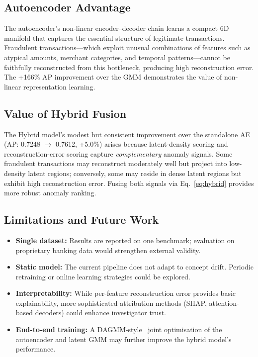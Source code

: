 \documentclass[conference,10pt]{IEEEtran}
\begin{document}
\subsection{Autoencoder Advantage}
The autoencoder's non-linear encoder--decoder chain learns a compact 6D
manifold that captures the essential structure of legitimate transactions.
Fraudulent transactions---which exploit unusual combinations of features such
as atypical amounts, merchant categories, and temporal patterns---cannot be
faithfully reconstructed from this bottleneck, producing high reconstruction
error.  The +166\% AP improvement over the GMM demonstrates the value of
non-linear representation learning.

\subsection{Value of Hybrid Fusion}
The Hybrid model's modest but consistent improvement over the standalone AE
(AP: 0.7248 $\rightarrow$ 0.7612, +5.0\%) arises because latent-density
scoring and reconstruction-error scoring capture \emph{complementary} anomaly
signals.  Some fraudulent transactions may reconstruct moderately well but
project into low-density latent regions; conversely, some may reside in dense
latent regions but exhibit high reconstruction error.  Fusing both signals via
Eq.~\eqref{eq:hybrid} provides more robust anomaly ranking.

\subsection{Limitations and Future Work}
\begin{itemize}[leftmargin=*]
\item \textbf{Single dataset:}  Results are reported on one benchmark;
      evaluation on proprietary banking data would strengthen external validity.
\item \textbf{Static model:}  The current pipeline does not adapt to concept
      drift.  Periodic retraining or online learning strategies could be
      explored.
\item \textbf{Interpretability:}  While per-feature reconstruction error
      provides basic explainability, more sophisticated attribution methods
      (SHAP, attention-based decoders) could enhance investigator trust.
\item \textbf{End-to-end training:}  A DAGMM-style~\cite{zong2018} joint
      optimisation of the autoencoder and latent GMM may further improve the
      hybrid model's performance.
\end{itemize}
\end{document}
